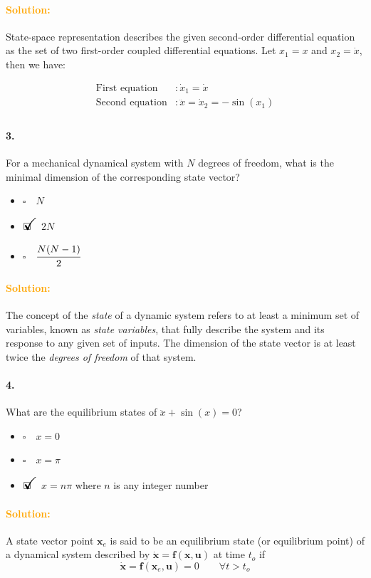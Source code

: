 \documentclass[12pt, a4paper]{article}
\newcommand{\ans}{\item[]$\rlap{\LARGE{\checkmark}}\square\quad$}
\newcommand{\noans}{\item[]$\square\quad$}
\begin{document}
\paragraph{\textcolor{orange}{Solution:}} 
State-space representation describes the given second-order differential equation as the set of two first-order coupled differential equations. Let $x_{1} = x$ and $x_{2} = \dot{x}$, then we have:

\begin{equation*}
\begin{split}
\text{First equation}&: \dot{x}_{1} = \dot{x}\\
\text{Second equation}&: \ddot{x} = \dot{x}_{2} = -\sin(x_{1}) \\
\end{split}
\end{equation*}

\paragraph{3.}
For a mechanical dynamical system with $N$ degrees of freedom, what is the minimal dimension of the corresponding state vector?

\begin{itemize}
\noans $N$
\ans $2N$
\noans $\cfrac{N(N-1)}{2}$
\end{itemize}

\paragraph{\textcolor{orange}{Solution:}}
The concept of the \textit{state} of a dynamic system refers to at least a minimum set of variables, known as \textit{state variables}, that fully describe the system and its response to any given set of inputs. The dimension of the state vector is at least twice the \textit{degrees of freedom} of that system.

\paragraph{4.}
What are the equilibrium states of $\ddot{x} + \sin(x) = 0$?

\begin{itemize}
\noans $x=0$
\noans $x=\pi$
\ans $x=n\pi$ where $n$ is any integer number
\end{itemize}

\paragraph{\textcolor{orange}{Solution:}}
A state vector point $\bm{x}_{e}$ is said to be an equilibrium state (or equilibrium point) of a dynamical system described by $\dot{\bm{x}} = \bm{f}(\bm{x},\bm{u})$ at time $t_{o}$ if
$$\dot{\bm{x}} = \bm{f}(\bm{x}_{e},\bm{u}) = 0 \quad \quad \forall t > t_{o}$$
\end{document}
